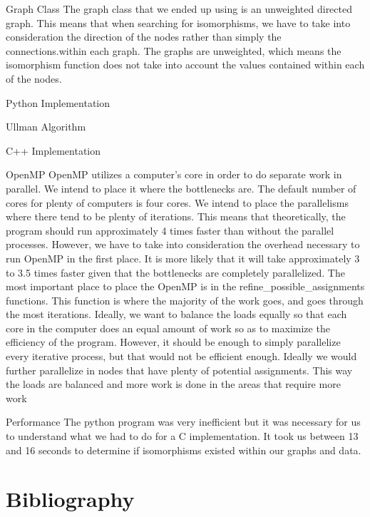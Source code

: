 \documentclass{article}
\begin{document}
Graph Class
The graph class that we ended up using is an unweighted directed graph. This means that when searching for isomorphisms, we have to take into consideration the direction of the nodes rather than simply the connections.within each graph. The graphs are unweighted, which means the isomorphism function does not take into account the values contained within each of the nodes.

Python Implementation

Ullman Algorithm

C++ Implementation

OpenMP
OpenMP utilizes a computer’s core in order to do separate work in parallel. We intend to place it where the bottlenecks are. The default number of cores for plenty of computers is four cores. We intend to place the parallelisms where there tend to be plenty of iterations. This means that theoretically, the program should run approximately 4 times faster than without the parallel processes. However, we have to take into consideration the overhead necessary to run OpenMP in the first place. It is more likely that it will take approximately 3 to 3.5 times faster given that the bottlenecks are completely parallelized. The most important place to place the OpenMP is in the refine\_possible\_assignments functions. This function is where the majority of the work goes, and goes through the most iterations. Ideally, we want to  balance the loads equally so that each core in the computer does an equal amount of work so as to maximize the efficiency of the program. However, it should be enough to simply parallelize every iterative process, but that would not be efficient enough. Ideally we would further parallelize in nodes that have plenty of potential assignments. This way the loads are balanced and more work is done in the areas that require more work

Performance
The python program was very inefficient but it was necessary for us to understand what we had to do for a C implementation. It took us between 13 and 16 seconds to determine if isomorphisms existed within our graphs and data.
  \section{Bibliography}
\end{document}
